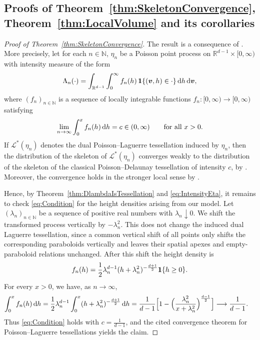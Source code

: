 \documentclass[11pt,a4paper]{article}
\theoremstyle{plain}
\theoremstyle{definition}
\theoremstyle{remark}
\newcommand{\dint}{\textup{d}}
\newcommand{\bv}{\boldsymbol{v}}
\def\NN{\mathbb{N}}
\def\RR{\mathbb{R}}
\def\cL{\mathcal{L}}
\begin{document}
\subsection{Proofs of Theorem~\ref{thm:SkeletonConvergence}, Theorem~\ref{thm:LocalVolume} and its corollaries}

\begin{proof}[Proof of Theorem~\ref{thm:SkeletonConvergence}]
	The result is a consequence of \cite[Theorem~3.6 and
		Theorem~3.8]{GiWL26}. More precisely, let for each $n\in\NN$, $\eta_n$ be a Poisson point
	process on $\RR^{d-1}\times[0,\infty)$ with intensity measure of the
	form
	\[
		\Lambda_n(\cdot)
		=
		\int_{\RR^{d-1}}\int_0^\infty
		f_n(h)\,{\bf 1}\{(\bv,h)\in\cdot\}\,\dint h\,\dint\bv,
	\]
	where $(f_n)_{n\in\NN}$ is a sequence of locally integrable functions $f_n:[0,\infty)\to[0,\infty)$
	satisfying
	\begin{equation}\label{eq:Condition}
		\lim_{n\to\infty}\int_0^x f_n(h)\,\dint h
		=
		c\in(0,\infty)
		\qquad\text{for all }x>0 .
	\end{equation}
	If $\cL^*(\eta_n)$ denotes the dual Poisson--Laguerre tessellation
	induced by $\eta_n$, then the distribution of the skeleton of
	$\cL^*(\eta_n)$ converges weakly to the distribution of the skeleton of
	the classical Poisson--Delaunay tessellation of intensity $c$, by
	\cite[Theorem~3.8]{GiWL26}. Moreover, the convergence holds in the
	stronger local sense by \cite[Theorem~3.6]{GiWL26}.

	Hence, by Theorem~\ref{thm:DlambdaIsTessellation} and
	\eqref{eq:IntensityEta}, it remains to check \eqref{eq:Condition} for
	the height densities arising from our model. Let
	$(\lambda_n)_{n\in\NN}$ be a sequence of positive real numbers with
	$\lambda_n\downarrow0$. We shift the transformed process vertically by
	$-\lambda_n^2$. This does not change the induced dual Laguerre
	tessellation, since a common vertical shift of all points only shifts the
	corresponding paraboloids vertically and leaves their spatial apexes and
	empty-paraboloid relations unchanged. After this shift the height density
	is
	\begin{equation}\label{eq:fnh}
		f_n(h)
		=
		\frac{1}{2}\lambda_n^{d-1}
		(h+\lambda_n^2)^{-\frac{d+1}{2}}
		{\bf 1}\{h\ge0\}.
	\end{equation}
	For every $x>0$, we have, as $n\to\infty$,
	\begin{align*}
		\int_0^x f_n(h)\,\dint h
		 & =
		\frac{1}{2}\lambda_n^{d-1}
		\int_0^x
		(h+\lambda_n^2)^{-\frac{d+1}{2}}\,\dint h  =
		\frac{1}{d-1}
		\Big[
		1-
		\Big(\frac{\lambda_n^2}{x+\lambda_n^2}\Big)^{\frac{d-1}{2}}
		\Big]
		\longrightarrow
		\frac{1}{d-1}.
	\end{align*}
	Thus \eqref{eq:Condition} holds with $c=\frac{1}{d-1}$, and the cited
	convergence theorem for Poisson--Laguerre tessellations yields the
	claim.
\end{proof}
\end{document}
